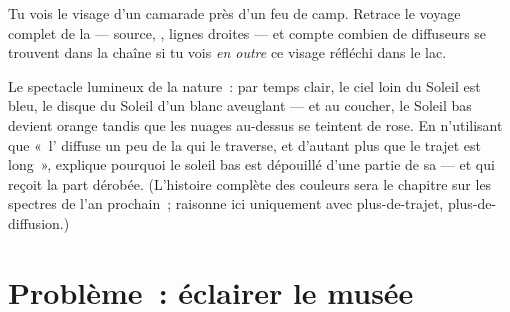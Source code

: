 \begin{exercise}[$\star\star$]\label{exo:g7:light-sources-propagation:11}
Tu vois le visage d'un camarade près d'un feu de camp. Retrace le
voyage complet de la  --- source, , lignes droites
--- et compte combien de diffuseurs se trouvent dans la chaîne si tu
vois \emph{en outre} ce visage réfléchi dans le lac.
\end{exercise}

\begin{exercise}[$\star\star\star$]\label{exo:g7:light-sources-propagation:12}
Le spectacle lumineux de la nature~: par temps clair, le ciel loin du
Soleil est bleu, le disque du Soleil d'un blanc aveuglant --- et au
coucher, le Soleil bas devient orange tandis que les nuages
au-dessus se teintent de rose. En n'utilisant que «~l' diffuse un
peu de la  qui le traverse, et d'autant plus que le trajet est
long~», explique pourquoi le soleil bas est dépouillé d'une partie de
sa  --- et qui reçoit la part dérobée. (L'histoire complète
des couleurs sera le chapitre sur les spectres de l'an prochain~;
raisonne ici uniquement avec plus-de-trajet, plus-de-diffusion.)
\end{exercise}

\section{Problème~: éclairer le musée}

